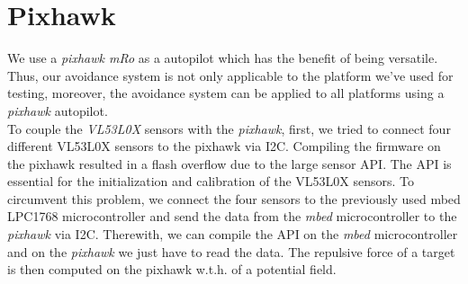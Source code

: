 \section{Pixhawk}
\label{sec:pixhawk}
We use a \textit{pixhawk mRo} as a autopilot which has the benefit of being versatile. Thus, our avoidance system is not only applicable to the platform we've used for testing, moreover, the avoidance system can be applied to all platforms using a \textit{pixhawk} autopilot.\\
To couple the \textit{VL53L0X} sensors with the \textit{pixhawk}, first, we tried to connect four different VL53L0X sensors to the pixhawk via I2C. Compiling the firmware on the pixhawk resulted in a flash overflow due to the large sensor API. The API is essential for the initialization and calibration of the VL53L0X sensors. To circumvent this problem, we connect the four sensors to the previously used mbed LPC1768 microcontroller and send the data from the \textit{mbed} microcontroller to the \textit{pixhawk} via I2C. Therewith, we can compile the API on the \textit{mbed} microcontroller and on the \textit{pixhawk} we just have to read the data. The repulsive force of a target is then computed on the pixhawk w.t.h. of a potential field.



